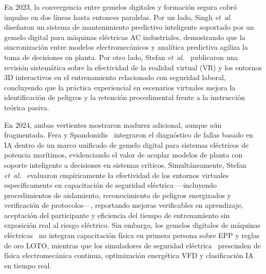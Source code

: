 En 2023, la convergencia entre gemelos digitales y formación segura cobró impulso en dos líneas hasta entonces paralelas. Por un lado, Singh \emph{et~al.}~\cite{Singh2023} diseñaron un sistema de mantenimiento predictivo inteligente soportado por un gemelo digital para máquinas eléctricas AC industriales, demostrando que la sincronización entre modelos electromecánicos y analítica predictiva agiliza la toma de decisiones en planta. Por otro lado, Stefan \emph{et~al.}~\cite{Stefan2023} publicaron una revisión sistemática sobre la efectividad de la realidad virtual (VR) y los entornos 3D interactivos en el entrenamiento relacionado con seguridad laboral, concluyendo que la práctica experiencial en escenarios virtuales mejora la identificación de peligros y la retención procedimental frente a la instrucción teórica pasiva.

En 2024, ambas vertientes mostraron madurez adicional, aunque aún fragmentada. Fera y Spandonidis~\cite{Maritime2024} integraron el diagnóstico de fallas basado en IA dentro de un marco unificado de gemelo digital para sistemas eléctricos de potencia marítimos, evidenciando el valor de acoplar modelos de planta con soporte inteligente a decisiones en sistemas críticos. Simultáneamente, Stefan \emph{et~al.}~\cite{Stefan2024} evaluaron empíricamente la efectividad de los entornos virtuales específicamente en capacitación de seguridad eléctrica ---incluyendo procedimientos de aislamiento, reconocimiento de peligros energizados y verificación de protocolos---, reportando mejoras verificables en aprendizaje, aceptación del participante y eficiencia del tiempo de entrenamiento sin exposición real al riesgo eléctrico. Sin embargo, los gemelos digitales de máquinas eléctricas~\cite{Singh2023,Maritime2024} no integran capacitación física en primera persona sobre EPP y reglas de oro LOTO, mientras que los simuladores de seguridad eléctrica~\cite{Stefan2023,Stefan2024} prescinden de física electromecánica continua, optimización energética VFD y clasificación IA en tiempo real.


